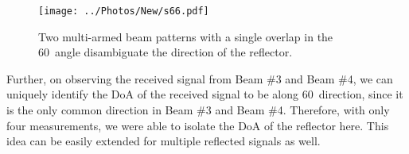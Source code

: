 





\iffalse


\begin{figure}
	\centering
	\texttt{[image: ../Photos/New/s66.pdf]}
	\caption{\footnotesize{Two multi-armed beam patterns with a single overlap in the 60\textdegree~angle disambiguate the direction of the reflector.}}
	\label{fig:beam1}
\end{figure}

Further, on observing the received signal from Beam \#3 and Beam \#4, we can uniquely identify the DoA of the received signal to be along 60\textdegree ~direction, since it is the only common direction in Beam \#3 and Beam \#4. Therefore, with only four measurements, we were able to isolate the DoA of the reflector here. This idea can be easily extended for multiple reflected signals as well.

